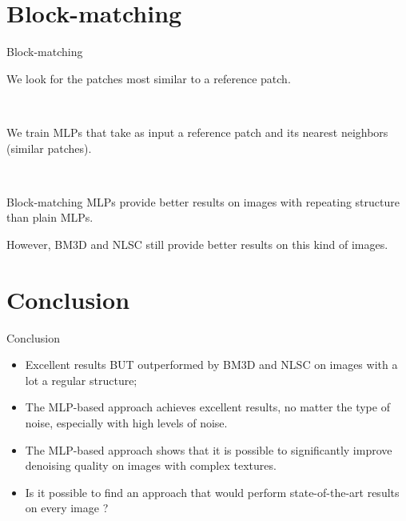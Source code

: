 \documentclass[8pt]{beamer}
\begin{document}
\section{Block-matching}
\begin{frame}{Block-matching}
\begin{mybox}
We look for the patches most similar to a reference patch.
\end{mybox}\

\begin{mybox}
We train MLPs that take as input a reference patch and its nearest neighbors (similar patches).
\end{mybox}\

\begin{mybox}[Results]
Block-matching MLPs provide better results on images with repeating structure than plain MLPs.

\vspace{0.5em}
However, BM3D and NLSC still provide better results on this kind of images.
\end{mybox}
\end{frame}






\section{Conclusion}

\begin{frame}{Conclusion}
%
\begin{itemize}
	\item Excellent results BUT outperformed by BM3D and NLSC on images with a lot a regular structure;
	\item The MLP-based approach achieves excellent results, no matter the type of noise, especially with high levels of noise.
	\item The MLP-based approach shows that it is possible to significantly improve denoising quality on images with complex textures.
	\item Is it possible to find an approach that would perform state-of-the-art results on every image ?
	
\end{itemize}

\end{frame}
\end{document}
